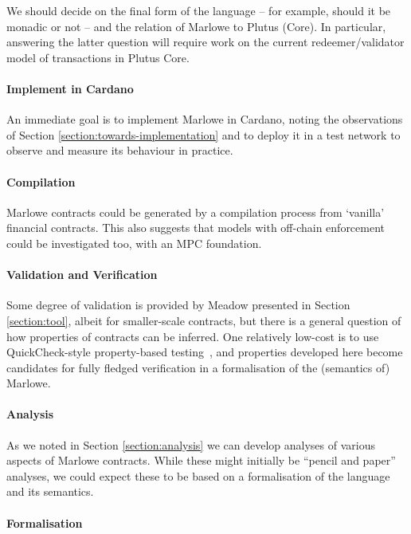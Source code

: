 \documentclass[runningheads]{llncs}
\begin{document}
We should decide on the final form of the language -- for example, should it be monadic or not -- and the relation of 
Marlowe to Plutus (Core). In particular, answering the latter question will require work on the current 
redeemer/validator model of transactions in Plutus Core.

\paragraph{Implement in Cardano}

An immediate goal is to implement Marlowe in Cardano, noting the observations of Section 
\ref{section:towards-implementation} and to deploy it in a test network to observe and measure its behaviour in 
practice.

\paragraph{Compilation}

Marlowe contracts could be generated by a compilation process from `vanilla' financial contracts. This also suggests 
that models with off-chain enforcement could be investigated too, with an MPC foundation.

\paragraph{Validation and Verification}

Some degree of validation is provided by Meadow presented in Section \ref{section:tool}, albeit for smaller-scale 
contracts, but there is a general question of how properties of contracts can be inferred. One relatively low-cost is to 
use QuickCheck-style property-based testing~\cite{quickCheck}, and properties developed here become candidates for 
fully fledged verification in a formalisation of the (semantics of) Marlowe.

\paragraph{Analysis}

As we noted in Section \ref{section:analysis} we can develop analyses of various aspects of Marlowe contracts. While 
these might initially be ``pencil and paper'' analyses, we could expect these to be based on a formalisation of the 
language and its semantics.

\paragraph{Formalisation} 
\end{document}

